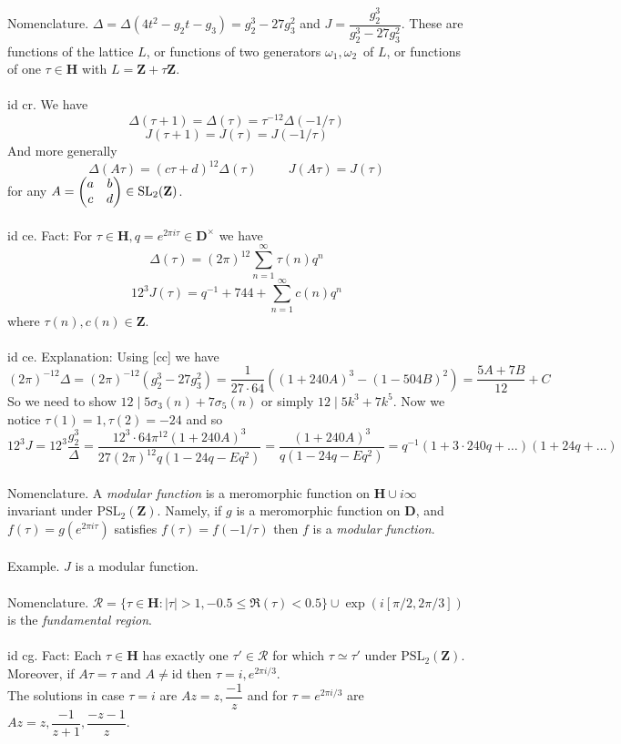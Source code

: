 \documentclass[oneside]{book}
\newcommand{\Z}{\mathbf{Z}}
\newcommand{\PSL}{\mathrm{PSL}}
\newcommand{\set}[1]{\{ #1\}}
\newcommand{\fit}[1]{\left( #1\right)}
\newcommand{\inv}{^{-1}}
\newcommand{\abs}[1]{\left\lvert #1\right\rvert}
\newcommand{\id}{\mathrm{id}}
\newcommand{\spc}{\phantom{-}}
\renewcommand{\H}{\mathbf{H}}
\newcommand{\D}{\mathbf{D}}
\newcommand{\RR}{\mathscr{R}}
\newcommand*\pmat[4]{\begin{pmatrix}#1&#2\\#3&#4\end{pmatrix}}
\begin{document}
Nomenclature. $\Delta=\Delta(4t^2-g_2t-g_3)=g_2^3-27g_3^2$ and $J=\dfrac{g_2^3}{g_2^3-27g_3^2}$. These are functions of the lattice $L$, or functions of two generators $\omega_1,\omega_2$\ of $L$, or functions of one $\tau\in\H$ with $L=\Z+\tau\Z$.\\\\


id cr. We have $$\Delta(\tau+1)=\Delta(\tau)=\tau^{-12}\Delta(-1/\tau)$$
$$J(\tau+1)=J(\tau)=J(-1/\tau)$$
And more generally $$\Delta(A\tau)=(c\tau+d)^{12}\Delta(\tau)\spc\spc J(A\tau)=J(\tau)$$
for any $A=\pmat{a}{b}{c}{d}\in\SL_2(\Z)$.\\\\


id ce. Fact: For $\tau\in\H, q=e^{2\pi i\tau}\in\D^\times$ we have $$\Delta(\tau)=(2\pi)^{12}\sum_{n=1}^\infty \tau(n)q^n$$
$$12^3J(\tau)=q\inv + 744 + \sum_{n=1}^\infty c(n)q^n$$
where $\tau(n),c(n)\in\Z$.\\\\


id ce. Explanation: Using [cc] we have $$(2\pi)^{-12}\Delta=(2\pi)^{-12}\fit{g_2^3-27g_3^2}=\dfrac{1}{27\cdot 64}\fit{(1+240A)^3 - (1-504B)^2} = \dfrac{5A+7B}{12}+ C $$ 
So we need to show $12\mid 5\sigma_3(n)+7\sigma_5(n)$ or simply $12\mid 5k^3+7k^5$. Now we notice $\tau(1)=1, \tau(2)=-24$ and so
$$12^3J = 12^3 \dfrac{g_2^3}{\Delta} = \dfrac{12^3 \cdot 64\pi^{12}(1+240A)^3}{27(2\pi)^{12}q(1-24q-Eq^2)}=\dfrac{(1+240A)^3}{q(1-24q-Eq^2)}=q\inv(1+3\cdot 240q+\dots)(1+24q+\dots)$$\\


Nomenclature. A {\it modular function} is a meromorphic function on $\H\cup{i\infty}$ invariant under $\PSL_2(\Z)$. Namely, if $g$ is a meromorphic function on $\D$, and $f(\tau)=g(e^{2\pi i\tau})$ satisfies $f(\tau)=f(-1/\tau)$ then $f$ is a {\it modular function}.\\\\


Example. $J$ is a modular function.\\\\


Nomenclature. $\RR=\set{\tau\in\H: \abs{\tau}>1, -0.5\le\Re(\tau)< 0.5}\cup \exp(i[\pi/2,2\pi/3])$ is the {\it fundamental region}.\\\\


id cg. Fact: Each $\tau\in \H$ has exactly one $\tau'\in \RR$ for which $\tau\simeq \tau'$ under $\PSL_2(\Z)$. \\
Moreover, if $A\tau=\tau$ and $A\neq\id$ then $\tau = i,e^{2\pi i/3}$. \\
The solutions in case $\tau=i$ are $Az=z,\dfrac{-1}{z}$ and for $\tau=e^{2\pi i/3}$ are $Az=z, \dfrac{-1}{z+1}, \dfrac{-z-1}{z}$. \\\\
\end{document}
